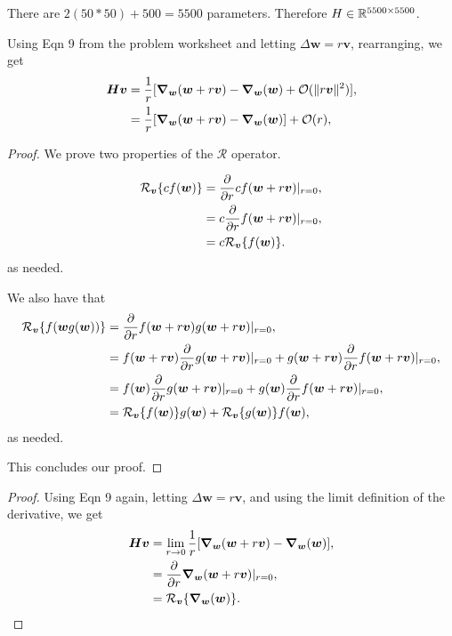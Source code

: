 \documentclass[twoside]{article}
\begin{document}
There are $2(50*50) + 500 = 5500$ parameters. Therefore $H \in \mathbb{R}^{5500 \times 5500}$.

Using Eqn 9 from the problem worksheet and letting $\Delta \bm{w} = r \bm{v}$, rearranging, we get
\begin{align*}
	\bm{Hv} & =
	\frac{1}{r} [\grad_{\bm{w}} (\bm{w} + r \bm{v}) - \grad_{\bm{w}}(\bm{w}) + \mathcal{O}(\lVert r \bm{v} \rVert^{2})], \\
	        & = \frac{1}{r} [\grad_{\bm{w}} (\bm{w} + r \bm{v}) - \grad_{\bm{w}}(\bm{w})] + \mathcal{O}(r),              \\
\end{align*}

\begin{proof}
	We prove two properties of the $\mathcal{R}$ operator.

	\begin{align*}
		\mathcal{R}_{\bm{v}}\{cf(\bm{w})\}
		 & = \pdv{}{r} cf(\bm{w} + r \bm{v}) |_{r = 0},  \\
		 & = c \pdv{}{r} f(\bm{w} + r \bm{v}) |_{r = 0}, \\
		 & = c\mathcal{R}_{\bm{v}}\{f(\bm{w})\}.
	\end{align*}
	as needed.

	We also have that
	\begin{align*}
		\mathcal{R}_{\bm{v}}\{f(\bm{w}g(\bm{w}))\}
		 & = \pdv{}{r} f(\bm{w} + r \bm{v})g(\bm{w} + r \bm{v}) |_{r = 0}, \\
		 & = f(\bm{w} + r \bm{v})\pdv{}{r}g(\bm{w} + r \bm{v}) |_{r = 0} +
		g(\bm{w} + r \bm{v})\pdv{}{r} f(\bm{w} + r \bm{v}) |_{r = 0},      \\
		 & = f(\bm{w})\pdv{}{r}g(\bm{w} + r \bm{v}) |_{r = 0} +
		g(\bm{w})\pdv{}{r} f(\bm{w} + r \bm{v}) |_{r = 0},                 \\
		 & = \mathcal{R}_{\bm{v}}\{f(\bm{w})\}g(\bm{w})
		+ \mathcal{R}_{\bm{v}}\{g(\bm{w})\}f(\bm{w}),                      \\
	\end{align*}
	as needed.

	This concludes our proof.
\end{proof}

\begin{proof}
	Using Eqn 9 again, letting $\Delta \bm{w} = r \bm{v}$,
	and using the limit definition of the derivative, we get
	\begin{align*}
		\bm{Hv}
		 & = \lim_{r \to 0} \frac{1}{r} [\grad_{\bm{w}} (\bm{w} + r \bm{v}) - \grad_{\bm{w}}(\bm{w})], \\
		 & = \pdv{}{r} \grad_{\bm{w}}(\bm{w} + r \bm{v}) |_{r = 0},                                    \\
		 & = \mathcal{R}_{\bm{v}}\{\grad_{\bm{w}}(\bm{w})\}.
	\end{align*}
\end{proof}
\end{document}
